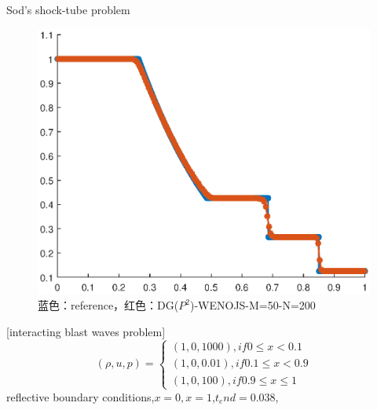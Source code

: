 \documentclass{book}
\begin{document}
\begin{example}
\begin{example}{}{}
\begin{example}
\begin{example}
\begin{example}
\begin{example}
\begin{example}{}{}
\begin{example}{Sod's shock-tube problem\cite{RN204}}{}
    \begin{figure}[H]
        \centering
        \label{fig:}
        \includegraphics[width=0.7\linewidth]{fig/sod.eps}
        \caption{蓝色：reference，红色：DG($P^2$)-WENOJS-M=50-N=200}
    \end{figure}
\end{example}
\begin{example}{}{}

    [interacting blast waves problem\cite{RN204}]
    \begin{equation}
        (\rho,u,p)=
        \begin{cases}
            (1,0,1000), if 0\leqslant x<0.1      \\
            (1,0,0.01), if 0.1 \leqslant x < 0.9 \\
            (1,0,100),if 0.9\leqslant x \leqslant 1
        \end{cases}
    \end{equation}
    reflective boundary conditions,$x=0,x=1$,$t_end=0.038$,
\end{example}
\begin{example}{}{}


\end{example}
\end{example}
\end{example}
\end{example}
\end{example}
\end{example}
\end{example}
\end{example}
\end{document}
